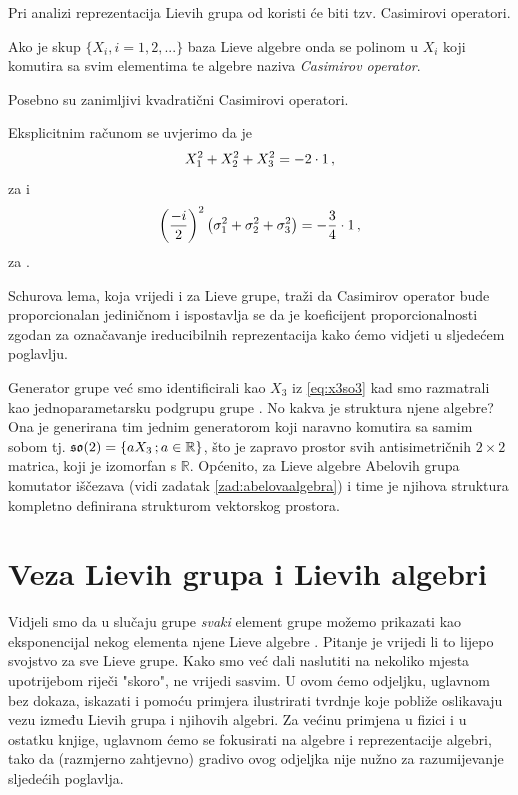 Pri analizi reprezentacija Lievih grupa od koristi će biti
tzv. Casimirovi operatori.
\begin{definicija}
Ako je skup $\{X_i, i=1,2, ... \}$ baza Lieve algebre onda se polinom
u $X_i$ koji komutira sa svim elementima te algebre naziva 
\emph{Casimirov operator}.
\end{definicija}
Posebno su zanimljivi kvadratični Casimirovi operatori.
\begin{primjer}
 Eksplicitnim računom se uvjerimo da je 
\begin{equation}
X_{1}^2 + X_{2}^2 + X_{3}^2 = -2\cdot 1 \,,
\end{equation}
    za  i
\begin{equation}
    \left(\frac{-i}{2}\right)^2
    \big(\sigma_{1}^2 + \sigma_{2}^2 + \sigma_{3}^2\big) = -\frac{3}{4} \cdot 1 \,,
\end{equation}
    za .
\end{primjer}
Schurova lema, koja vrijedi i za Lieve grupe, traži da Casimirov operator 
bude proporcionalan jediničnom i ispostavlja se da je koeficijent proporcionalnosti
zgodan za označavanje ireducibilnih reprezentacija kako ćemo vidjeti u sljedećem poglavlju.


\begin{primjer}
    Generator grupe  već smo identificirali kao $X_3$ iz
    \ref{eq:x3so3} kad smo 
    razmatrali kao jednoparametarsku podgrupu grupe .
    No kakva je struktura njene algebre? Ona je generirana tim
    jednim generatorom koji naravno komutira sa samim sobom
    tj. $\mathfrak{so}(2) = \{ aX_{3}\,; a \in \mathbb{R} \}$, što je
    zapravo prostor svih antisimetričnih $2\times 2$ matrica,
    koji je izomorfan s $\mathbb{R}$.
    Općenito, za Lieve algebre Abelovih grupa komutator iščezava 
    (vidi zadatak \ref{zad:abelovaalgebra}) i time
    je njihova struktura kompletno definirana strukturom vektorskog
    prostora. \label{pr:so2Alg}
\end{primjer}


\section{Veza Lievih grupa i Lievih algebri}

Vidjeli smo da u slučaju grupe  
\emph{svaki} element grupe možemo prikazati kao eksponencijal nekog
elementa njene Lieve algebre .
Pitanje je vrijedi li to lijepo svojstvo za sve Lieve grupe.
Kako smo već dali naslutiti na nekoliko mjesta upotrijebom riječi "skoro",
ne vrijedi sasvim. U ovom ćemo odjeljku, uglavnom
bez dokaza, iskazati i pomoću primjera ilustrirati tvrdnje koje 
pobliže oslikavaju vezu između Lievih grupa i njihovih algebri.
Za većinu primjena u fizici i u ostatku knjige, uglavnom ćemo
se fokusirati na algebre i reprezentacije algebri, tako da (razmjerno
zahtjevno) gradivo ovog odjeljka nije nužno za razumijevanje sljedećih
poglavlja.

